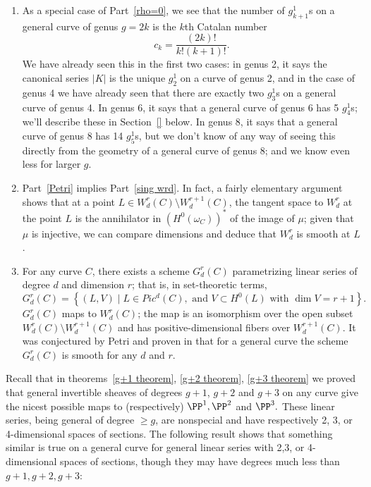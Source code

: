 \begin{remark}
\begin{enumerate}
\item As a special case of Part~\ref{rho=0}, we see that the number of $g^1_{k+1}$s on a general curve of genus $g = 2k$ is the $k$th Catalan number 
$$
c_k = \frac{(2k)!}{k!(k+1)!}.
$$
We have already seen this in the first two cases: in genus 2, it says the canonical series $|K|$ is the unique $g^1_2$ on a curve of genus 2, and in the case of genus 4 we have already seen  that there are exactly two $g^1_3$s on a general curve of genus 4. In genus 6, it says that a general curve of genus 6 has 5 $g^1_4$s; we'll describe these in Section~\ref{} below.  In genus 8, it says that a general curve of genus 8 has 14 $g^1_5$s, but we don't know of any way of seeing this directly from the geometry of a general curve of genus 8; and we know even less for larger $g$.

\item Part~\ref{Petri} implies Part~\ref{sing wrd}. In fact, a fairly elementary argument shows that at a point $L \in W^r_d(C) \setminus W^{r+1}_d(C)$, the tangent space to $W^r_d$ at the point $L$ is the annihilator
in $(H^0(\omega_C))^*$ of the image of $\mu$; given that $\mu$ is injective, we can compare dimensions and deduce that $W^r_d$ is smooth at $L$.

\item For any curve $C$, there exists a scheme $G^r_d(C)$ parametrizing linear series of degree $d$ and dimension $r$; that is, in set-theoretic terms,
$$
G^r_d(C) = \left\{ (L, V) \mid L \in Pic^d(C), \text{ and } V \subset H^0(L) \text{ with } \dim V = r+1 \right\}.
$$
$G^r_d(C)$ maps to $W^r_d(C)$; the map is an isomorphism over the open subset $W^r_d(C) \setminus W^{r+1}_d(C)$ and has positive-dimensional fibers over $W^{r+1}_d(C)$. It was conjectured
by Petri and proven in \cite{Gieseker-Petri} that for a general curve the scheme $G^r_d(C)$ is smooth for any $d$ and $r$.
\end{enumerate}
\end{remark}


Recall that  in theorems~\ref{g+1 theorem}, \ref{g+2 theorem}, \ref{g+3 theorem} we proved that
general invertible sheaves of degrees $g+1$, $g+2$ and $g+3$ on any curve
give the nicest possible maps to (respectively) $\PP^1, \PP^2$ and $\PP^3.$ These
linear series, being general of degree $\geq g$, are  nonspecial and have respectively
2, 3, or 4-dimensional spaces of sections. The following result shows that something
similar is true on a general curve for general linear series with 2,3, or 4-dimensional
spaces of sections, though they may have degrees much less than $g+1, g+2, g+3$:

